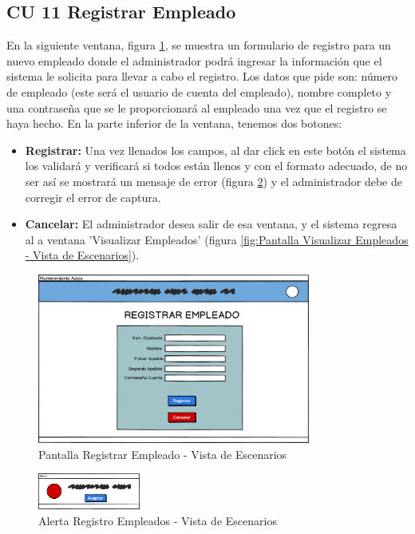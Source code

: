 \subsection{CU 11 Registrar Empleado}
En la siguiente ventana, figura \ref{fig:Pantalla Registrar Empleado - Vista de Escenarios}, se muestra un formulario de registro para un nuevo empleado donde el administrador podrá ingresar la información que el sistema le solicita para llevar a cabo el registro. Los datos que pide son: número de empleado (este será el usuario de cuenta del empleado), nombre completo y una contraseña que se le proporcionará al empleado una vez que el registro se haya hecho. En la parte inferior de la ventana, tenemos dos botones:
\begin{itemize}
	\item \textbf{Registrar:} Una vez llenados los campos, al dar click en este botón el sistema los validará y verificará si todos están llenos y con el formato adecuado, de no ser así se mostrará un mensaje de error (figura \ref{fig:Alerta Registro Empleados - Vista de Escenarios}) y el administrador debe de corregir el error de captura.
	\item \textbf{Cancelar: } El administrador desea salir de esa ventana, y el sistema regresa al a ventana 'Visualizar Empleados' (figura \ref{fig:Pantalla Visualizar Empleados - Vista de Escenarios}).
\end{itemize}
\begin{figure}[!h]
	\centering
	\includegraphics[width=0.8\textwidth]{./diseno/vescenarios/imagenes/registrarEmpleado}
	\caption{Pantalla Registrar Empleado - Vista de Escenarios}
	\label{fig:Pantalla Registrar Empleado - Vista de Escenarios}
\end{figure}
\begin{figure}[!h]
	\centering
	\includegraphics[width=0.3\textwidth]{./diseno/vescenarios/imagenes/alerta}
	\caption{Alerta Registro Empleados - Vista de Escenarios}
	\label{fig:Alerta Registro Empleados - Vista de Escenarios}
\end{figure}
\clearpage